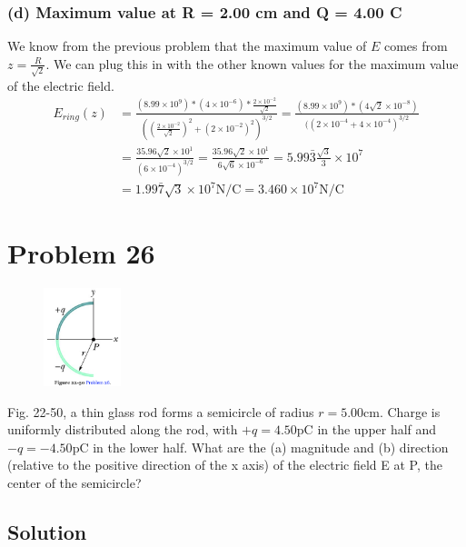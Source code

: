\documentclass[12pt]{article}
\begin{document}
\subsubsection*{(d) Maximum value at R = 2.00 cm and Q = 4.00 C}
We know from the previous problem that the maximum value of $E$ comes from $z = \frac{R}{\sqrt{2}}$. We can plug this in with the other known values for the maximum value of the electric field.
\begin{align*}
    E_{ring}(z) &=  \frac{(8.99 \times 10^9)*(4 \times 10^{-6})*\frac{2 \times 10^{-2}}{\sqrt{2}}}{((\frac{2 \times 10^{-2}}{\sqrt{2}})^2 + (2 \times 10^{-2})^2)^{3/2}}
        =   \frac{(8.99 \times 10^9)*(4\sqrt{2} \times 10^{-8})}{((2 \times 10^{-4} + 4 \times 10^{-4})^{3/2}}\\
        &=  \frac{35.96\sqrt{2} \times 10^{1}}{(6 \times 10^{-4})^{3/2}}
        =   \frac{35.96\sqrt{2} \times 10^1}{6\sqrt{6} \times 10^{-6}}
        =   5.99\bar{3}\frac{\sqrt{3}}{3} \times 10^{7}\\
        &=  1.99\bar{7} \sqrt{3} \times 10^{7} \unit{\newton/\coulomb}
        =   \boxed{3.460 \times 10^{7} \unit{\newton/\coulomb}}
\end{align*}

\pagebreak
\section{Problem 26}
\begin{figure}
    \vspace{-30pt}
    \includegraphics[width=0.2\textwidth]{picture_6.png} 
\end{figure}
Fig. 22-50, a thin glass rod forms a semicircle of radius $r = 5.00 \unit{\centi\meter}$. Charge is uniformly distributed along the rod, with $+q = 4.50 \unit{\pico\coulomb}$ in the upper half and $-q = -4.50 \unit{\pico\coulomb}$ in the lower half. What are the (a) magnitude and (b) direction (relative to the positive direction of the x axis) of the electric field E at P, the center of the semicircle?

\subsection*{Solution}
\end{document}
